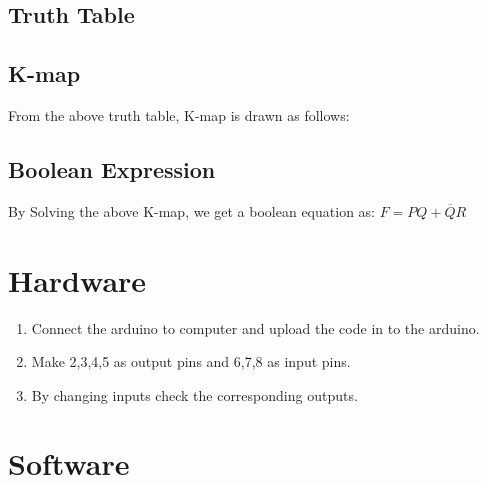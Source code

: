 \documentclass[journal,10pt, a4paper]{article}
\begin{document}
\subsection{Truth Table}                 
                                 

\subsection{K-map}
From the above truth table, K-map is drawn as follows:


\subsection{Boolean Expression}
By Solving the above K-map, we get a boolean equation as: $F=PQ+\overline{Q}R$

\section{Hardware}
\begin{enumerate}
\item Connect the arduino to computer and upload the code in to the arduino.
\item Make 2,3,4,5 as output pins and 6,7,8 as input pins.
\item By changing inputs check the corresponding outputs.
\end{enumerate}

\section{Software}

\end{document}
